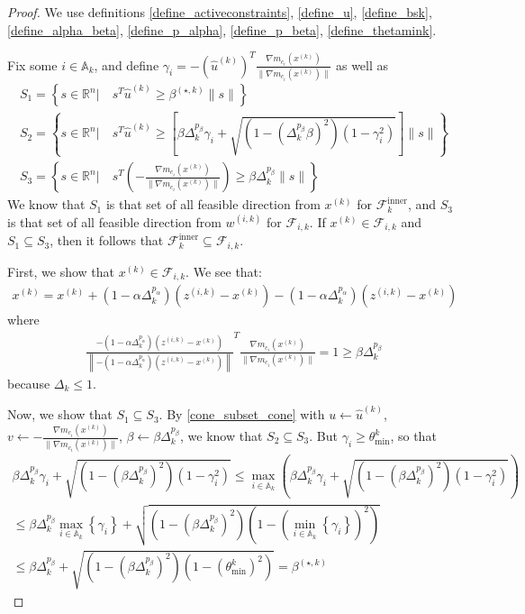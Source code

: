 \documentclass{article}
\theoremstyle{case}
\newcommand{\activeconstraintsk}{{\mathbb A_{k}}}
\newcommand{\bsk}{{\beta^{(\star, k)}}}
\newcommand{\dk}{\Delta_k}
\newcommand{\fcki}{{\mathcal {F}^{\text{inner}}_k}}
\newcommand{\fik}{{\mathcal F_{i, k}}}
\newcommand{\gmcik}{{\nabla m_{c_i}^{(k)}\left(\xk\right)}}
\newcommand{\hgik}{{\frac{\nabla m_{c_i}(\xk)}{\|\nabla m_{c_i}(\xk)\|}}}
\newcommand{\huk}{{{\hat u}^{(k)}}}
\newcommand{\Rn}{\mathbb R^n}
\newcommand{\thetamink}{{\theta^k_{\text{min}}}}
\newcommand{\wik}{{w^{(i, k)}}}
\newcommand{\xk}{{x^{(k)}}}
\newcommand{\zik}{{z^{(i, k)}}}
\begin{document}
\begin{proof}
We use definitions
\cref{define_activeconstraints}, \cref{define_u}, \cref{define_bsk}, \cref{define_alpha_beta}, \cref{define_p_alpha}, \cref{define_p_beta}, \cref{define_thetamink}.

Fix some $i \in \activeconstraintsk$, and define $\gamma_i = -\left(\huk\right)^T\hgik$ as well as
\begin{align*}
S_1 = \left\{s\in\Rn | \quad s^T\huk\ge\bsk\|s\| \right\} \\
S_2 = \left\{s\in\Rn | \quad s^T\huk\ge\left[\beta\dk^{p_{\beta}}\gamma_i + \sqrt{(1 - \left(\dk^{p_{\beta}}\beta\right)^2)\left(1 - \gamma_i^2\right)}\right]\|s\| \right\} \\
S_3 = \left\{s\in\Rn | \quad s^T\left(-\hgik\right)\ge\beta\dk^{p_{\beta}}\|s\| \right\}
\end{align*}
We know that $S_1$ is that set of all feasible direction from $\xk$ for $\fcki$, and $S_3$ is that set of all feasible direction from $\wik$ for $\fik$.
If $\xk \in \fik$ and $S_1 \subseteq S_3$, then it follows that $\fcki \subseteq \fik$.

First, we show that $\xk \in \fik$.
We see that:
\begin{align*}
\xk = \xk + \left(1 - \alpha\dk^{p_{\alpha} }\right)(\zik - \xk) - \left(1 - \alpha\dk^{p_{\alpha} }\right)(\zik - \xk)
\end{align*}
where
\begin{align*}
\frac{-\left(1 - \alpha\dk^{p_{\alpha} }\right)(\zik - \xk)}{\left\|-\left(1 - \alpha\dk^{p_{\alpha} }\right)(\zik - \xk)\right\|}^T\hgik = 1 \ge \beta \dk^{p_{\beta}}
\end{align*}
because $\dk \le 1$.

Now, we show that $S_1 \subseteq S_3$.
By \cref{cone_subset_cone} with $u \gets \huk$, $v \gets -\hgik$, $\beta \gets \beta \dk^{p_{\beta}}$, we know that
$S_2 \subseteq S_3$.
But $\gamma_i \ge \thetamink$, so that
\begin{align*}
\beta\dk^{p_{\beta}}\gamma_i + \sqrt{\left(1 - \left(\beta\dk^{p_{\beta}}\right)^2\right)\left(1 - \gamma_i^2\right)}
\le \max_{i\in\activeconstraintsk} \left(\beta\dk^{p_{\beta}}\gamma_i + \sqrt{\left(1 - \left(\beta\dk^{p_{\beta}}\right)^2\right)\left(1 - \gamma_i^2\right)}\right) \\
\le \beta\dk^{p_{\beta}} \max_{i\in\activeconstraintsk}\left\{\gamma_i\right\} + \sqrt{\left(1 - \left(\beta\dk^{p_{\beta}}\right)^2\right)\left(1 - \left(\min_{i\in\activeconstraintsk}\left\{\gamma_i\right\}\right)^2\right)} \\
\le \beta\dk^{p_{\beta}} + \sqrt{\left(1 - \left(\beta\dk^{p_{\beta}}\right)^2\right)\left(1 - \left(\thetamink\right)^2\right)} = \bsk
\end{align*}


\end{proof}
\end{document}
